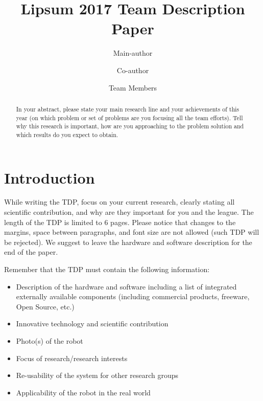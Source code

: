 \documentclass[runningheads,a4paper]{llncs}
\begin{document}
\title{Lipsum 2017 Team Description Paper}

\author{Main-author \and Co-author \and Team Members }
\maketitle



\begin{abstract}

In your abstract, please state your main research line and your achievements of this year (on which problem or set of problems are you focusing all the team efforts). Tell why this research is important, how are you approaching to the problem solution and which results do you expect to obtain.

\end{abstract}



\section{Introduction}
While writing the TDP, focus on your current research, clearly stating all scientific contribution, and why are they important for you and the league. The length of the TDP is limited to 6 pages. Please notice that changes to the margins, space between paragraphs, and font size are not allowed (such TDP will be rejected). We suggest to leave the hardware and software description for the end of the paper.

Remember that the TDP must contain the following information:

\begin{itemize}
	\item Description of the hardware and software including a list of integrated externally available components (including commercial products, freeware, Open Source, etc.)
	\item Innovative technology and scientific contribution
	\item Photo(s) of the robot
	\item Focus of research/research interests
	\item Re-usability of the system for other research groups
	\item Applicability of the robot in the real world
\end{itemize}
\end{document}
